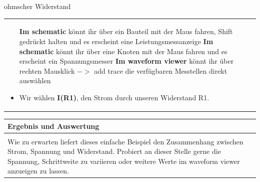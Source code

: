 \begin{frame}[t]{ohmscher Widerstand}
\begin{spacing}{0.9}
\begin{tiny}
\begin{table}[h!]
\begin{tabular}{p{5cm} p{5cm}}
\begin{minipage}{.5\textwidth}
\begin{itemize}
            \textbf{Im schematic} könnt ihr über ein Bauteil mit der Maus fahren, Shift gedrückt halten und es erscheint eine Leistungsmessanzeige\newline\newline
            \textbf{Im schematic} könnt ihr über eine Knoten mit der Maus fahren und es erscheint ein Spannungsmesser\newline\newline
            \textbf{Im waveform viewer} könnt ihr über rechten Mausklick $->$ add trace die verfügbaren Messtellen direkt auswählen
            \item Wir wählen \textbf{I(R1)}, den Strom durch unseren Widerstand R1. 
          \end{itemize}
          \end{minipage} 
          \\
        \end{tabular}
      \end{table}
    \end{tiny} \end{spacing}
    
      \begin{spacing}{0.9} \begin{tiny}
        \begin{table}[h!]
          \begin{tabular}{p{10cm} }
            \hline
            \textbf{Ergebnis und Auswertung} \\
            \hline \\    
            Wie zu erwarten liefert dieses einfache Beispiel den Zusammenhang zwischen Strom, Spannung und Widerstand. Probiert an dieser Stelle gerne die Spannung, Schrittweite
            zu variieren oder weitere Werte im waveform viewer anzueigen zu lassen.
          \end{tabular}
        \end{table}
      \end{tiny} \end{spacing}
      
       \end{frame}